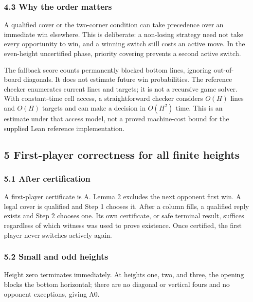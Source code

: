 \documentclass[
  a4paper,
]{article}
\begin{document}
\subsubsection{4.3 Why the order matters}\label{why-the-order-matters}

A qualified cover or the two-corner condition can take precedence over
an immediate win elsewhere. This is deliberate: a non-losing strategy
need not take every opportunity to win, and a winning switch still costs
an active move. In the even-height uncertified phase, priority covering
prevents a second active switch.

The fallback score counts permanently blocked bottom lines, ignoring
out-of-board diagonals. It does not estimate future win probabilities.
The reference checker enumerates current lines and targets; it is not a
recursive game solver. With constant-time cell access, a straightforward
checker considers \(O(H)\) lines and \(O(H)\) targets and can make a
decision in \(O(H^2)\) time. This is an estimate under that access
model, not a proved machine-cost bound for the supplied Lean reference
implementation.

\subsection{5 First-player correctness for all finite
heights}\label{first-player-correctness-for-all-finite-heights}

\subsubsection{5.1 After certification}\label{after-certification}

A first-player certificate is A. Lemma 2 excludes the next opponent
first win. A legal cover is qualified and Step 1 chooses it. After a
column fills, a qualified reply exists and Step 2 chooses one. Its own
certificate, or safe terminal result, suffices regardless of which
witness was used to prove existence. Once certified, the first player
never switches actively again.

\subsubsection{5.2 Small and odd heights}\label{small-and-odd-heights}

Height zero terminates immediately. At heights one, two, and three, the
opening blocks the bottom horizontal; there are no diagonal or vertical
fours and no opponent exceptions, giving A0.
\end{document}
